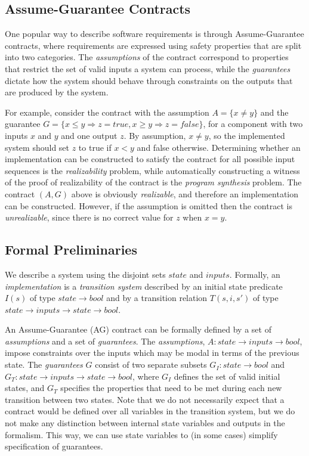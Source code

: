 \subsection{Assume-Guarantee Contracts}

One popular way to describe software requirements is through Assume-Guarantee contracts, where requirements are expressed using safety properties that are split into two categories. The \emph{assumptions} of the contract correspond to properties that restrict the set of valid inputs a system can process, while the \emph{guarantees} dictate how the system should behave through constraints on the outputs that are produced by the system.

For example, consider the contract with the assumption $A = \{x\neq
y\}$ and the guarantee $G = \{x \leq y \Longrightarrow z =
\textit{true}, x \geq y \Longrightarrow z = \textit{false}\}$, for a component with two inputs $x$ and $y$ and one output $z$.  By assumption, $x \neq y$, so the implemented system should set $z$ to true if $x < y$ and false otherwise.  %
%
Determining whether an implementation can be constructed to satisfy the contract for all possible input sequences is the \emph{realizability} problem, while automatically constructing a witness of the proof of
realizability of the contract is the \emph{program synthesis} problem.  The contract $(A,G)$ above is obviously \emph{realizable}, and therefore an implementation can be constructed.
However, if the assumption is omitted then the contract is \emph{unrealizable}, since there is no correct value for $z$ when $x=y$.

\subsection{Formal Preliminaries}
\label{sec:pre}

We describe a system using the disjoint sets $state$ and $inputs$.
Formally, an \emph{implementation} is a \emph{transition system}
described by an initial state predicate $I(s)$ of type $state \to
bool$ and by a transition relation $T(s,i,s')$ of type $state \to
inputs \to state \to bool$.

An Assume-Guarantee (AG) contract can be formally defined by a set of
\emph{assumptions} and a set of \emph{guarantees}. The
\emph{assumptions}, $A: state \rightarrow inputs \rightarrow bool$,
impose constraints over the inputs which may be modal in terms of the
previous state. The \emph{guarantees} $G$ consist of two separate
subsets $G_I: state \rightarrow bool$ and $G_T: state \rightarrow
inputs \rightarrow state \rightarrow bool$, where $G_I$ defines the
set of valid initial states, and $G_T$ specifies the properties that
need to be met during each new transition between two states. Note
that we do not necessarily expect that a contract would be defined
over all variables in the transition system, but we do not make any
distinction between internal state variables and outputs in the
formalism. This way, we can use state variables to (in some cases)
simplify specification of guarantees.

